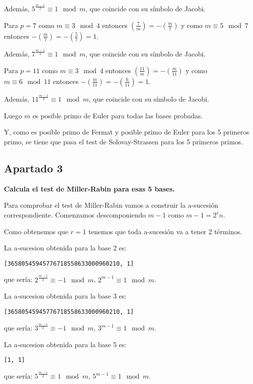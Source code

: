 \documentclass[a4paper]{article}
\begin{document}
Además, $5^{\frac{m-1}{2}}\equiv 1\mod m$, que coincide con su símbolo de Jacobi.

Para $p=7$ como $m\equiv 3\mod 4$ entonces $\left( \frac{7}{m}\right)=-\left( \frac{m}{7}\right)$ y como $m\equiv 5\mod 7$ entonces $-\left( \frac{m}{7}\right)=-\left( \frac{5}{7}\right)=1$.

Además, $7^{\frac{m-1}{2}}\equiv 1\mod m$, que coincide con su símbolo de Jacobi.

Para $p=11$ como $m\equiv 3\mod 4$ entonces $\left( \frac{11}{m}\right)=-\left( \frac{m}{11}\right)$ y como $m\equiv 6\mod 11$ entonces $-\left( \frac{m}{11}\right)=-\left( \frac{6}{11}\right)=1$.

Además, $11^{\frac{m-1}{2}}\equiv 1\mod m$, que coincide con su símbolo de Jacobi.

Luego $m$ es posible primo de Euler para todas las bases probadas.

Y, como es posible primo de Fermat y posible primo de Euler para los 5 primeros primo, se tiene que pasa el test de Solovay-Strassen para los 5 primeros primos.

\subsection{Apartado 3}

\textbf{Calcula el test de Miller-Rabin para esas 5 bases.}

Para comprobar el test de Miller-Rabin vamos a construir la a-sucesión correspondiente. Comenzamos descomponiendo $m-1$ como $m-1=2^rn$.

Como obtenemos que $r=1$ tenemos que toda a-sucesión va a tener 2 términos.

La a-sucesion obtenida para la base 2 es:
\begin{verbatim}
[36580545945776718558633000960210, 1]
\end{verbatim}
que sería: $2^{\frac{m-1}{2}}\equiv -1\mod m$, $2^{m-1}\equiv 1\mod m$.

La a-sucesion obtenida para la base 3 es:
\begin{verbatim}
[36580545945776718558633000960210, 1]
\end{verbatim}
que sería: $3^{\frac{m-1}{2}}\equiv -1\mod m$, $3^{m-1}\equiv 1\mod m$.

La a-sucesion obtenida para la base 5 es:
\begin{verbatim}
[1, 1]
\end{verbatim}
que sería: $5^{\frac{m-1}{2}}\equiv 1\mod m$, $5^{m-1}\equiv 1\mod m$.
\end{document}
